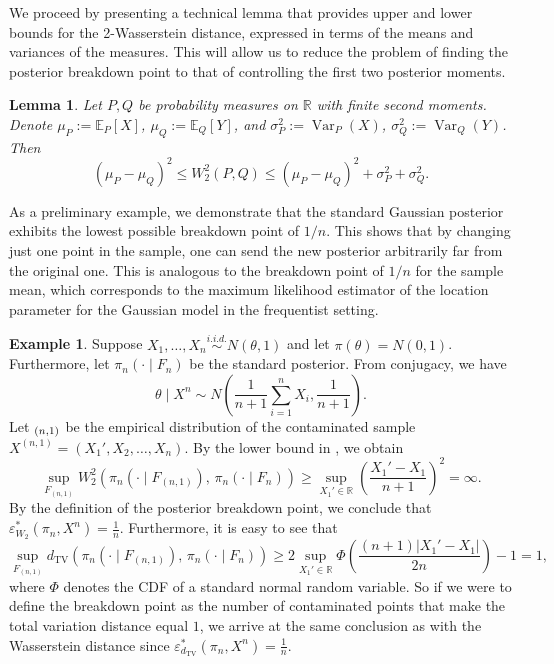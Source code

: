 \documentclass[11pt, oneside]{amsart}
\newtheorem{lemma}{Lemma}
\theoremstyle{definition}   %
\newtheorem{example}{Example}
\let\P\relax
\newcommand{\P}{\mathbb{P}}
\newcommand{\Var}{\operatorname{Var}}
\begin{document}
%
We proceed by presenting a technical lemma that provides upper and lower bounds for the 2-Wasserstein distance, expressed in terms of the means and variances of the measures. This will allow us to reduce the problem of finding the posterior breakdown point to that of  controlling the first two posterior moments. 
%
\begin{lemma}
\label{lemma::bounds-on-W2}
    Let $P,Q$ be probability measures on $\mathbb{R}$ with finite second moments. Denote
    \( \mu_P:=\mathbb{E}_P[X] \), \( \mu_Q:=\mathbb{E}_Q[Y] \), and \( \sigma_P^2:=\Var_P(X) \), \( \sigma_Q^2:=\Var_Q(Y) \).
    Then
    \[
    (\mu_P-\mu_Q)^2 \leq W_2^2(P,Q) \le (\mu_P-\mu_Q)^2 + \sigma_P^2 + \sigma_Q^2.
    \]
\end{lemma}
%
%
As a preliminary example, we demonstrate that the standard Gaussian posterior exhibits the lowest possible breakdown point of
\( 1/n \). This shows that by changing just one point in the sample, one can send the new posterior arbitrarily far from the original one. This is  analogous to the breakdown point of $1/n$ for the sample mean, which corresponds to the  maximum likelihood estimator of the location parameter for the Gaussian model in the frequentist setting.
%
\begin{example}
\label{example::BP-gaussian}
    Suppose \( X_1, \ldots, X_n  \overset{i.i.d.}{\sim} N(\theta, 1)\) and let \(  \pi(\theta) = N(0, 1) \).
    Furthermore, let \( \pi_n(\cdot \mid F_n)\) be the standard posterior. From conjugacy, we have
    \[
        \theta \mid X^n \sim N \left (\frac{1}{n+1}\sum_{i = 1}^n X_i, \frac{1}{n+1} \right ).
    \]
    Let \( \P_{(n,1)}\) be the empirical distribution of the contaminated sample \( X^{(n,1)} = (X_1', X_2, \ldots, X_n)\).
    By the lower bound in , we obtain
    \[
        \sup_{F_{(n,1)}} W_2^2 \left (\pi_n(\cdot \mid F_{(n,1)}), \, \pi_n (\cdot \mid F_n ) \right) \geq \sup_{X_1' \in \mathbb{R}} \left ( \frac{X_1' - X_1}{n+1} \right )^2 = \infty.
    \]
    By the definition of the posterior breakdown point, we conclude that \( \varepsilon^*_{W_2} \left (\pi_n, X^n \right ) = \frac{1}{n} \).
     Furthermore, it is easy to see that 
    $$\sup_{F_{(n,1)}} d_{\mathrm{TV}} \left (\pi_n(\cdot \mid F_{(n,1)}), \, \pi_n (\cdot \mid F_n ) \right) \geq 2\sup_{X_1' \in \mathbb{R}}\Phi\left(\frac{(n+1)|X_1'-X_1|}{2 n}\right)-1= 1,$$
    where $\Phi$ denotes the CDF of a standard normal random variable.
    So if we were to define the breakdown point as the number of contaminated points that make the total variation distance equal $1$, we arrive at the same conclusion as with the Wasserstein distance since \( \varepsilon^*_{d_{\mathrm{TV}}} (\pi_n, X^n ) = \frac{1}{n} \).
\end{example}
\end{document}
